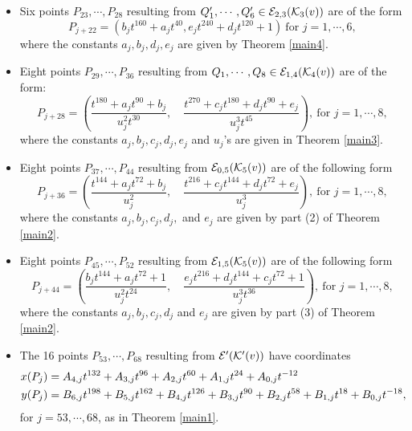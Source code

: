 \documentclass[11pt]{amsart}
\begin{document}
\begin{thm}
\begin{itemize}
			
				\item[(7)] Six points  $P_{23}, \cdots, P_{28}$  resulting from $Q'_1, \cdots, Q'_6 \in {\mathcal E}_{2, 3}({\mathcal K}_3(v))$ are of the   form
			$$P_{j+22}= \left( b_j t^{160} + a_j t^{40},
			e_j t^{240} + d_j t^{120} + 1 \right)  \ \text{for } j=1,\cdots, 6,$$
			where the constants $a_j, b_j,  d_j, e_j$ are given 
	 	by Theorem \ref{main4}.
			
				
			\item[(8)] Eight points $P_{29}, \cdots, P_{36}$   resulting from $
			Q_1, \cdots, Q_8 \in {\mathcal E}_{1, 4}({\mathcal K}_4(v))$  are of the   form:
			$$P_{j+28}=\left(  \frac{t^{180}+ a_j t^{90} + b_j}{u_j^2 t^{30}}, \quad
			\frac{t^{270}+ c_j t^{180} + d_j t^{90} + e_j}{u_j^3 t^{45}}\right), \ \text{for } j=1,\cdots, 8, $$
			where the constants $a_j, b_j, c_j,  d_j, e_j$ and $u_j$'s are given in Theorem \ref{main3}.
		
					\item[(9)]
			Eight points $P_{37}, \cdots, P_{44}$ resulting from ${\mathcal E}_{0,5}({\mathcal K}_5(v))$ are of the  following form
			$$P_{j+36}=\left(\frac{t^{144}+ a_j t^{72} + b_j}{u_j^2 }, \quad
			\frac{t^{216}+ c_j t^{144} + d_j t^{72} + e_j}{u_j^3}\right), \ \text{for } j=1,\cdots, 8, $$
			where the constants $a_j, b_j, c_j,  d_j, $ and $e_j$ are given by part (2) of Theorem \ref{main2}.
			
				
			\item[(10)]
			Eight points $P_{45}, \cdots, P_{52}$   resulting from ${\mathcal E}_{1,5}({\mathcal K}_5(v))$  are of the following form 
			$$P_{j+44}=\left(\frac{b_j t^{144}+ a_j t^{72} + 1}{u_j^2 t^{24}}, \quad
			\frac{e_j t^{216}+ d_j t^{144} + c_j t^{72} + 1}{u_j^3 t^{36}}\right), \ \text{for } j=1,\cdots, 8, $$
			where the constants $a_j, b_j, c_j,  d_j$ and $  e_j$ are given by part (3) of Theorem \ref{main2}.
			
			\item[(11)] The 16 points $P_{53}, \cdots, P_{68}$ resulting from ${\mathcal E}' ({\mathcal K}'(v)) $ have coordinates
		\begin{align*}
			x(P_{j}) & =   A_{4,j} t^{132} + A_{3,j} t^{96} + A_{2,j} t^{60} + A_{1,j} t^{24} + A_{0,j} t^{-12} \notag \\ 			 
			y(P_{j}) &=   B_{6,j} t^{198} + B_{5,j} t^{162} + B_{4,j} t^{126} +B_{3,j} t^{90} + B_{2,j} t^{58}
		+	B_{1,j} t^{18} + B_{0,j} t^{-18}, 
		\end{align*}
	for $j=53, \cdots, 68$, as in Theorem \ref{main1}.
	\end{itemize}
\end{thm}
\end{document}
